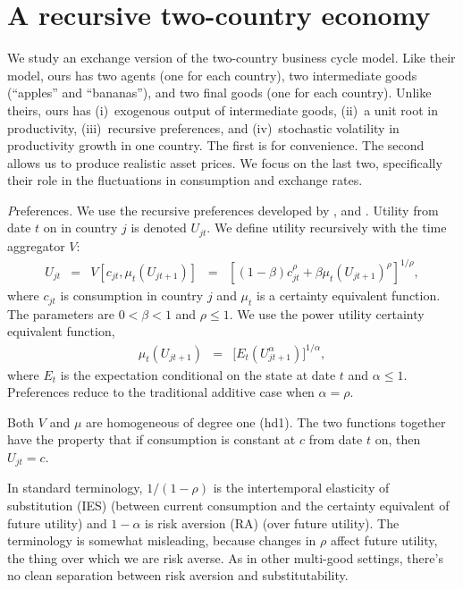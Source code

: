
\section{A recursive two-country economy}
\label{sec:model}

We study an exchange version of the \citet{Backus1994-bi}
two-country business cycle model.
Like their model, ours has
two agents (one for each country),
two intermediate goods (``apples'' and ``bananas''),
and two final goods (one for each country).
Unlike theirs, ours has
(i)~exogenous output of intermediate goods,
(ii)~a unit root in productivity,
(iii)~recursive preferences,
and (iv)~stochastic volatility in productivity growth in one country.
The first is for convenience.
The second allows us to produce realistic asset prices.
We focus on the last two, specifically their role in the fluctuations in
consumption and exchange rates.


{\textit Preferences.\/} We use the recursive preferences developed by
\citet{Epstein1989-mt,Kreps1978-gf}, and \citet{Weil1989-vy}.
Utility from date $t$ on in country $j$ is denoted $U_{jt}$.
We define utility recursively with the time aggregator $V$:
\begin{eqnarray}
    U_{jt} &=& V [c_{jt}, \mu_{t} (U_{jt+1})]
            \;\;=\;\; [(1-\beta) c_{jt}^{\rho} + \beta \mu_{t} (U_{jt+1})^{\rho}]^{1/\rho} ,
            \label{eq:time-agg}
\end{eqnarray}
where $c_{jt}$ is consumption in country $j$ and $\mu_t$ is a certainty equivalent function.
The parameters are $ 0 < \beta < 1$ and $\rho \leq 1$.
We use the power utility certainty equivalent function,
\begin{eqnarray}
    \mu_{t} (U_{jt+1} ) &=&  \big[ E_t  (U_{jt+1}^{\alpha} ) \big]^{1/\alpha} ,
            \label{eq:cert-equiv}
\end{eqnarray}
where $E_t$ is the expectation conditional on the state at date $t$
and $\alpha \leq 1$.
Preferences reduce to the traditional additive case when $\alpha = \rho$.


Both $V$ and $\mu$ are homogeneous of degree one (hd1).
The two functions together have the property that if consumption is constant at $c$ from date $t$ on,
then $U_{jt} = c$.

In standard terminology, $ 1/(1-\rho)$ is the intertemporal elasticity of substitution (IES)
(between current consumption and the certainty equivalent of future utility)
and $1-\alpha$ is risk aversion (RA) (over future utility).
The terminology is somewhat misleading, because changes in $\rho$ affect future utility,
the thing over which we are risk averse.
As in other multi-good settings, there's no clean separation between risk aversion
and substitutability.

